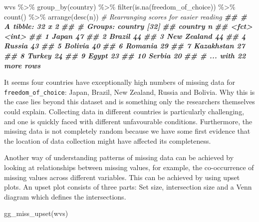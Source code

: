\documentclass[
]{book}
\newenvironment{Shaded}{\begin{snugshade}}{\end{snugshade}}
\newcommand{\CommentTok}[1]{\textcolor[rgb]{0.56,0.35,0.01}{\textit{#1}}}
\newcommand{\DocumentationTok}[1]{\textcolor[rgb]{0.56,0.35,0.01}{\textbf{\textit{#1}}}}
\newcommand{\FunctionTok}[1]{\textcolor[rgb]{0.00,0.00,0.00}{#1}}
\newcommand{\NormalTok}[1]{#1}
\newcommand{\SpecialCharTok}[1]{\textcolor[rgb]{0.00,0.00,0.00}{#1}}
\begin{document}
\begin{Shaded}
\begin{Highlighting}[]
\NormalTok{wvs }\SpecialCharTok{\%\textgreater{}\%} 
  \FunctionTok{group\_by}\NormalTok{(country) }\SpecialCharTok{\%\textgreater{}\%} 
  \FunctionTok{filter}\NormalTok{(}\FunctionTok{is.na}\NormalTok{(freedom\_of\_choice)) }\SpecialCharTok{\%\textgreater{}\%} 
  \FunctionTok{count}\NormalTok{() }\SpecialCharTok{\%\textgreater{}\%} 
  \FunctionTok{arrange}\NormalTok{(}\FunctionTok{desc}\NormalTok{(n))                      }\CommentTok{\# Rearranging scores for easier reading}
\DocumentationTok{\#\# \# A tibble: 32 x 2}
\DocumentationTok{\#\# \# Groups:   country [32]}
\DocumentationTok{\#\#    country         n}
\DocumentationTok{\#\#    \textless{}fct\textgreater{}       \textless{}int\textgreater{}}
\DocumentationTok{\#\#  1 Japan          47}
\DocumentationTok{\#\#  2 Brazil         44}
\DocumentationTok{\#\#  3 New Zealand    44}
\DocumentationTok{\#\#  4 Russia         43}
\DocumentationTok{\#\#  5 Bolivia        40}
\DocumentationTok{\#\#  6 Romania        29}
\DocumentationTok{\#\#  7 Kazakhstan     27}
\DocumentationTok{\#\#  8 Turkey         24}
\DocumentationTok{\#\#  9 Egypt          23}
\DocumentationTok{\#\# 10 Serbia         20}
\DocumentationTok{\#\# \# ... with 22 more rows}
\end{Highlighting}
\end{Shaded}

It seems four countries have exceptionally high numbers of missing data for \texttt{freedom\_of\_choice}: Japan, Brazil, New Zealand, Russia and Bolivia. Why this is the case lies beyond this dataset and is something only the researchers themselves could explain. Collecting data in different countries is particularly challenging, and one is quickly faced with different unfavourable conditions. Furthermore, the missing data is not completely random because we have some first evidence that the location of data collection might have affected its completeness.

Another way of understanding patterns of missing data can be achieved by looking at relationships between missing values, for example, the co-occurrence of missing values across different variables. This can be achieved by using upset plots. An upset plot consists of three parts: Set size, intersection size and a Venn diagram which defines the intersections.

\begin{Shaded}
\begin{Highlighting}[]
\FunctionTok{gg\_miss\_upset}\NormalTok{(wvs)}
\end{Highlighting}
\end{Shaded}
\end{document}
